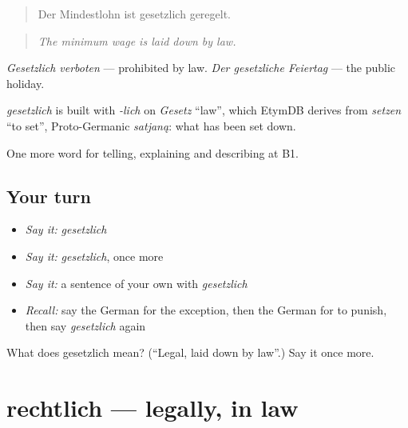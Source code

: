 \begin{quote}
Der Mindestlohn ist gesetzlich geregelt.
\end{quote}

\begin{quote}
\emph{The minimum wage is laid down by law.}
\end{quote}

\emph{Gesetzlich verboten} — prohibited by law. \emph{Der gesetzliche Feiertag} — the public holiday.

\begin{cousinweb}
\emph{gesetzlich} is built with \emph{-lich} on \emph{Gesetz} \textquotedblleft{}law\textquotedblright{}, which EtymDB derives from \emph{setzen} \textquotedblleft{}to set\textquotedblright{}, Proto-Germanic \emph{satjaną}: what has been set down.
\end{cousinweb}

\begin{grammarlens}[title={What you've built}]
One more word for telling, explaining and describing at B1.
\end{grammarlens}

\subsection*{Your turn}
\begin{itemize}
\raggedright
  \item \emph{Say it:} \emph{gesetzlich}
  \item \emph{Say it:} \emph{gesetzlich}, once more
  \item \emph{Say it:} a sentence of your own with \emph{gesetzlich}
  \item \emph{Recall:} say the German for the exception, then the German for to punish, then say \emph{gesetzlich} again
\end{itemize}

\begin{tcolorbox}[breakable,colback=teal!4,colframe=teal!35!black,title={Before you move on}]
What does gesetzlich mean? (\textquotedblleft{}Legal, laid down by law\textquotedblright{}.) Say it once more.
\end{tcolorbox}
\section[rechtlich]{rechtlich — legally, in law}

\label{lesson:GE-C385-rechtlich}




